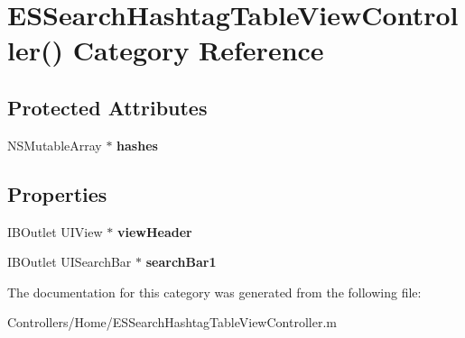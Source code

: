 \hypertarget{category_e_s_search_hashtag_table_view_controller_07_08}{}\section{E\+S\+Search\+Hashtag\+Table\+View\+Controller() Category Reference}
\label{category_e_s_search_hashtag_table_view_controller_07_08}
\subsection*{Protected Attributes}
\begin{DoxyCompactItemize}
\item 
\hypertarget{category_e_s_search_hashtag_table_view_controller_07_08_ae9adaa8299d850ae95d43d785458ce09}{}N\+S\+Mutable\+Array $\ast$ {\bfseries hashes}\label{category_e_s_search_hashtag_table_view_controller_07_08_ae9adaa8299d850ae95d43d785458ce09}

\end{DoxyCompactItemize}
\subsection*{Properties}
\begin{DoxyCompactItemize}
\item 
\hypertarget{category_e_s_search_hashtag_table_view_controller_07_08_ae17260d8eecbe36190017707beab450f}{}I\+B\+Outlet U\+I\+View $\ast$ {\bfseries view\+Header}\label{category_e_s_search_hashtag_table_view_controller_07_08_ae17260d8eecbe36190017707beab450f}

\item 
\hypertarget{category_e_s_search_hashtag_table_view_controller_07_08_afeae6d0c366f2b71352f154efb5c5e03}{}I\+B\+Outlet U\+I\+Search\+Bar $\ast$ {\bfseries search\+Bar1}\label{category_e_s_search_hashtag_table_view_controller_07_08_afeae6d0c366f2b71352f154efb5c5e03}

\end{DoxyCompactItemize}


The documentation for this category was generated from the following file\+:\begin{DoxyCompactItemize}
\item 
Controllers/\+Home/E\+S\+Search\+Hashtag\+Table\+View\+Controller.\+m\end{DoxyCompactItemize}
